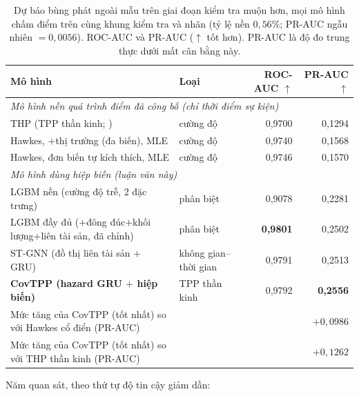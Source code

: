 \documentclass[11pt,a4paper]{article}
\begin{document}
\begin{table}[ht]
\centering
\caption{Dự báo bùng phát ngoài mẫu trên giai đoạn kiểm tra muộn hơn, mọi mô hình chấm điểm trên cùng khung kiểm tra và nhãn (tỷ lệ nền $0{,}56\%$; PR-AUC ngẫu nhiên $=0{,}0056$). ROC-AUC và PR-AUC ($\uparrow$ tốt hơn). PR-AUC là độ đo trung thực dưới mất cân bằng này.}
\label{tab:m2}
\begin{tabular}{llrr}
\toprule
Mô hình & Loại & ROC-AUC $\uparrow$ & PR-AUC $\uparrow$ \\
\midrule
\multicolumn{4}{l}{\emph{Mô hình nền quá trình điểm đã công bố (chỉ thời điểm sự kiện)}} \\
THP (TPP thần kinh; \citealt{zuo2020thp})        & cường độ  & 0,9700 & 0,1294 \\
Hawkes, $+$thị trường (đa biến), MLE      & cường độ  & 0,9740 & 0,1568 \\
Hawkes, đơn biến tự kích thích, MLE      & cường độ  & 0,9746 & 0,1570 \\
\midrule
\multicolumn{4}{l}{\emph{Mô hình dùng hiệp biến (luận văn này)}} \\
LGBM nền (cường độ trễ, 2 đặc trưng)    & phân biệt\  & 0,9078 & 0,2281 \\
LGBM đầy đủ ($+$đông đúc$+$khối lượng$+$liên tài sản, đã chỉnh) & phân biệt\ & \textbf{0,9801} & 0,2502 \\
ST-GNN (đồ thị liên tài sản $+$ GRU)         & không gian--thời gian & 0,9791 & 0,2513 \\
\textbf{CovTPP (hazard GRU $+$ hiệp biến)} & TPP thần kinh & 0,9792 & \textbf{0,2556} \\
\midrule
Mức tăng của CovTPP (tốt nhất) so với Hawkes cổ điển (PR-AUC) &        &        & $+0{,}0986$ \\
Mức tăng của CovTPP (tốt nhất) so với THP thần kinh (PR-AUC)       &        &        & $+0{,}1262$ \\
\bottomrule
\end{tabular}
\end{table}

Năm quan sát, theo thứ tự độ tin cậy giảm dần:
\end{document}
